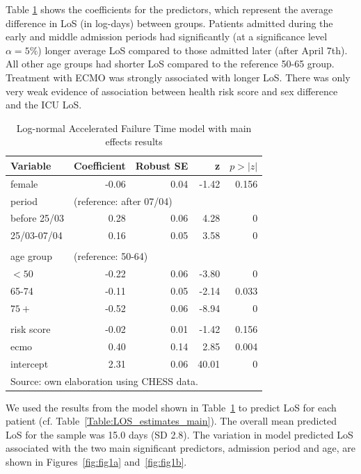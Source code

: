\documentclass[review]{elsarticle}
\begin{document}
Table \ref{Table:main_model} shows the coefficients for the predictors, which represent the average difference in LoS (in log-days) between groups. Patients admitted during the early and middle admission periods had significantly (at a significance level $\alpha=5\%$) longer average LoS compared to those admitted later (after April 7th). All other age groups had shorter LoS compared to the reference 50-65 group. Treatment with ECMO was strongly associated with longer LoS. There was only very weak evidence of association between health risk score and sex difference and the ICU LoS. 

\begin{table}[htb]
\caption{Log-normal Accelerated Failure Time model with main effects results  \label{Table:main_model} }
\centering
\begin{tabular}{lrrrr}
\toprule
Variable	&	Coefficient	&	Robust SE	&	z	&	$p>|z|$	\\\midrule
     female	&	-0.06	&	0.04	&	-1.42	&	0.156	\\
           									
period	&	\multicolumn{4}{l}{(reference: after 07/04)}							\\
before 25/03	&	0.28	&	0.06	&	4.28	&	0	\\
25/03-07/04	&	0.16	&	0.05	&	3.58	&	0	\\
									\\
age group	&	\multicolumn{4}{l}{(reference: 50-64)}							\\
       $<50$ 	&	-0.22	&	0.06	&	-3.80	&	0	\\
     65-74 	&	-0.11	&	0.05	&	-2.14	&	0.033	\\
       $75+$ 	&	-0.52	&	0.06	&	-8.94	&	0	\\
       \\
risk score	&	-0.02	&	0.01	&	-1.42	&	0.156	\\
       ecmo	&	0.40	&	0.14	&	2.85	&	0.004	\\
intercept	&	2.31	&	0.06	&	40.01	&	0	\\\bottomrule
\multicolumn{5}{l}{\scriptsize{Source: own elaboration using CHESS data.}}
\end{tabular}
 \end{table}
  
We used the results from the model shown in Table~\ref{Table:main_model} to predict LoS for each patient (cf. Table~\ref{Table:LOS_estimates_main}). The overall mean predicted LoS for the sample was 15.0 days (SD 2.8). The variation in model predicted LoS associated with the two main significant predictors, admission period and age, are shown in Figures~\ref{fig:fig1a} and~\ref{fig:fig1b}.
\end{document}
